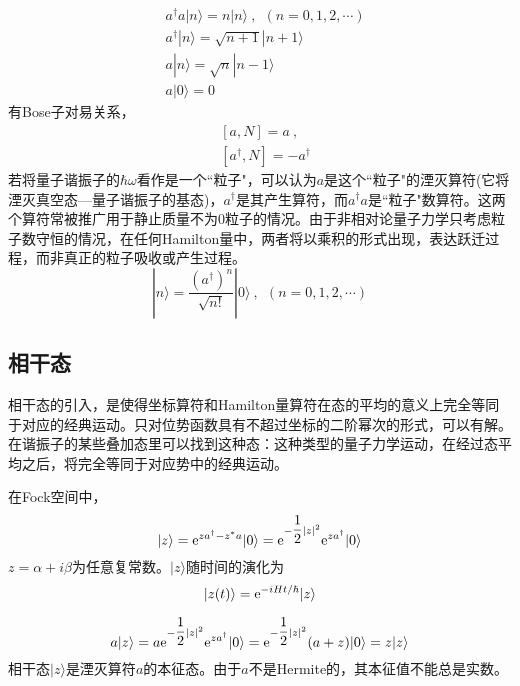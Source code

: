 \documentclass[11pt,a4paper]{article}
\begin{document}
\begin{align}
& a^\dagger a | n\rangle = n | n\rangle ~, ~~ (n = 0, 1, 2, \cdots) \\
& a^\dagger| n\rangle = \sqrt{n+1} | n+1\rangle \\
& a | n \rangle = \sqrt{n} | n-1\rangle \\
& a | 0 \rangle = 0
\end{align}
有Bose子对易关系，
\begin{align}
& [a, N] = a ~, \\
& [a^\dagger, N] = -a^\dagger
\end{align}
若将量子谐振子的$\hbar \omega$看作是一个``粒子"，可以认为$a$是这个``粒子"的湮灭算符(它将湮灭真空态---量子谐振子的基态)，$a^\dagger$是其产生算符，而$a^\dagger a$是``粒子"数算符。这两个算符常被推广用于静止质量不为$0$粒子的情况。由于非相对论量子力学只考虑粒子数守恒的情况，在任何Hamilton量中，两者将以乘积的形式出现，表达跃迁过程，而非真正的粒子吸收或产生过程。
\begin{equation}
|n\rangle = \dfrac{(a^\dagger)^n}{\sqrt{n!}} |0\rangle ~, ~~ (n = 0, 1, 2, \cdots)
\end{equation}













\subsection{相干态}
相干态的引入，是使得坐标算符和Hamilton量算符在态的平均的意义上完全等同于对应的经典运动。只对位势函数具有不超过坐标的二阶幂次的形式，可以有解。在谐振子的某些叠加态里可以找到这种态：这种类型的量子力学运动，在经过态平均之后，将完全等同于对应势中的经典运动。

在Fock空间中，
\begin{equation}
|z\rangle = {\rm e}^{za^\dagger -z^\ast a} |0 \rangle  = {\rm e}^{-\dfrac{1}{2}|z|^2} {\rm e}^{za^\dagger} |0 \rangle
\end{equation}
$z = \alpha +i\beta$为任意复常数。$|z\rangle$随时间的演化为
\begin{equation*}
|z(t) \rangle = {\rm e}^{-iHt/\hbar} |z \rangle
\end{equation*}

\begin{equation}
a |z \rangle = a{\rm e}^{-\dfrac{1}{2}|z|^2} {\rm e}^{za^\dagger} |0 \rangle = {\rm e}^{-\dfrac{1}{2}|z|^2} (a+z)  |0 \rangle = z |z \rangle
\end{equation}
相干态$|z\rangle$是湮灭算符$a$的本征态。由于$a$不是Hermite的，其本征值不能总是实数。
\end{document}
